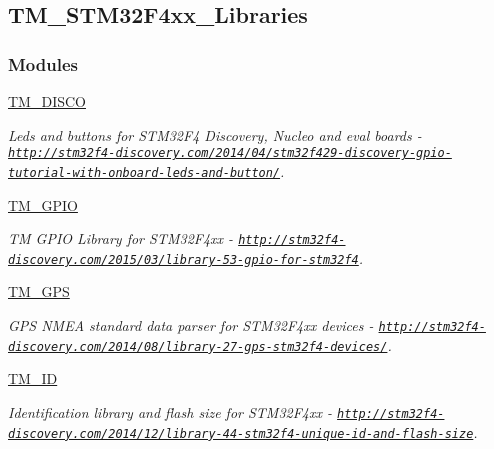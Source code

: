 \hypertarget{group___t_m___s_t_m32_f4xx___libraries}{}\subsection{T\+M\+\_\+\+S\+T\+M32\+F4xx\+\_\+\+Libraries}
\label{group___t_m___s_t_m32_f4xx___libraries}
\subsubsection*{Modules}
\begin{DoxyCompactItemize}
\item 
\hyperlink{group___t_m___d_i_s_c_o}{T\+M\+\_\+\+D\+I\+S\+C\+O}
\begin{DoxyCompactList}\small\item\em Leds and buttons for S\+T\+M32\+F4 Discovery, Nucleo and eval boards -\/ \href{http://stm32f4-discovery.com/2014/04/stm32f429-discovery-gpio-tutorial-with-onboard-leds-and-button/}{\tt http\+://stm32f4-\/discovery.\+com/2014/04/stm32f429-\/discovery-\/gpio-\/tutorial-\/with-\/onboard-\/leds-\/and-\/button/}. \end{DoxyCompactList}\item 
\hyperlink{group___t_m___g_p_i_o}{T\+M\+\_\+\+G\+P\+I\+O}
\begin{DoxyCompactList}\small\item\em T\+M G\+P\+I\+O Library for S\+T\+M32\+F4xx -\/ \href{http://stm32f4-discovery.com/2015/03/library-53-gpio-for-stm32f4}{\tt http\+://stm32f4-\/discovery.\+com/2015/03/library-\/53-\/gpio-\/for-\/stm32f4}. \end{DoxyCompactList}\item 
\hyperlink{group___t_m___g_p_s}{T\+M\+\_\+\+G\+P\+S}
\begin{DoxyCompactList}\small\item\em G\+P\+S N\+M\+E\+A standard data parser for S\+T\+M32\+F4xx devices -\/ \href{http://stm32f4-discovery.com/2014/08/library-27-gps-stm32f4-devices/}{\tt http\+://stm32f4-\/discovery.\+com/2014/08/library-\/27-\/gps-\/stm32f4-\/devices/}. \end{DoxyCompactList}\item 
\hyperlink{group___t_m___i_d}{T\+M\+\_\+\+I\+D}
\begin{DoxyCompactList}\small\item\em Identification library and flash size for S\+T\+M32\+F4xx -\/ \href{http://stm32f4-discovery.com/2014/12/library-44-stm32f4-unique-id-and-flash-size}{\tt http\+://stm32f4-\/discovery.\+com/2014/12/library-\/44-\/stm32f4-\/unique-\/id-\/and-\/flash-\/size}. \end{DoxyCompactList}\item 

\end{DoxyCompactItemize}
